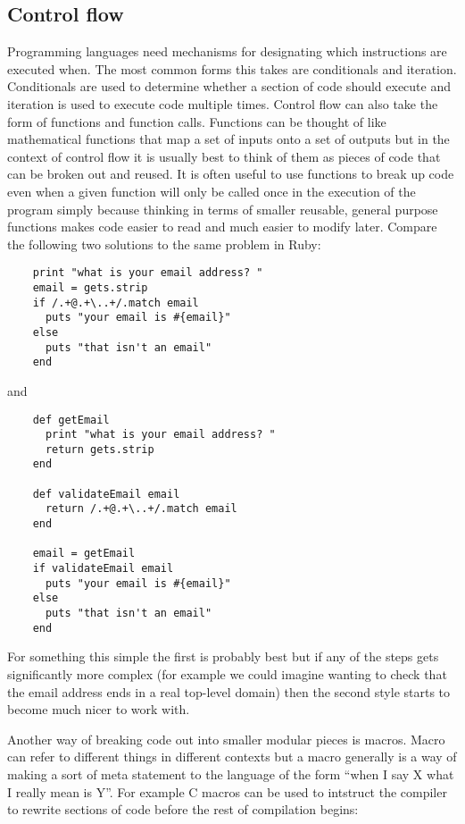 \documentclass[11pt]{article}
\begin{document}
      
\subsection*{Control flow}
\label{sec-1.1}

   Programming languages need mechanisms for designating which
   instructions are executed when.  The most common forms this takes
   are conditionals and iteration.  Conditionals are used to determine
   whether a section of code should execute and iteration is used to
   execute code multiple times.  Control flow can also take the form
   of functions and function calls.  Functions can be thought of like
   mathematical functions that map a set of inputs onto a set of
   outputs but in the context of control flow it is usually best to
   think of them as pieces of code that can be broken out and reused.
   It is often useful to use functions to break up code even when a
   given function will only be called once in the execution of the
   program simply because thinking in terms of smaller reusable,
   general purpose functions makes code easier to read and much easier
   to modify later.  Compare the following two solutions to the same
   problem in Ruby:
   
\begin{verbatim}
    print "what is your email address? "
    email = gets.strip
    if /.+@.+\..+/.match email
      puts "your email is #{email}"
    else
      puts "that isn't an email"
    end
\end{verbatim}

   
   and 
   
\begin{verbatim}
    def getEmail
      print "what is your email address? "
      return gets.strip
    end
    
    def validateEmail email
      return /.+@.+\..+/.match email
    end
    
    email = getEmail
    if validateEmail email
      puts "your email is #{email}"
    else
      puts "that isn't an email"   
    end
\end{verbatim}

   
   For something this simple the first is probably best but if any of
   the steps gets significantly more complex (for example we could
   imagine wanting to check that the email address ends in a real
   top-level domain) then the second style starts to become much nicer
   to work with.
   
   Another way of breaking code out into smaller modular pieces is
   macros.  Macro can refer to different things in different contexts
   but a macro generally is a way of making a sort of meta statement to
   the language of the form ``when I say X what I really mean is Y''.
   For example C macros can be used to intstruct the compiler to
   rewrite sections of code before the rest of compilation begins:
   
\end{document}
